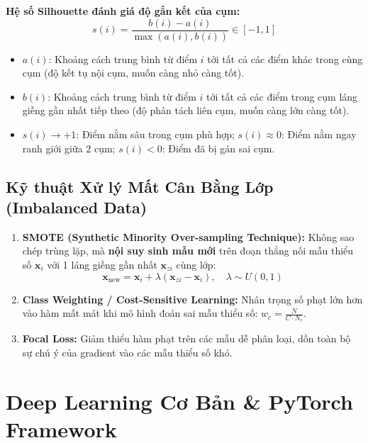 \documentclass[10pt,a4paper]{article}
\begin{document}
\textbf{Hệ số Silhouette đánh giá độ gắn kết của cụm:}
\begin{equation}
    s(i) = \frac{b(i) - a(i)}{\max(a(i), b(i))} \in [-1, 1]
\end{equation}
\begin{itemize}[leftmargin=*]
    \item $a(i)$: Khoảng cách trung bình từ điểm $i$ tới tất cả các điểm khác trong cùng cụm (độ kết tụ nội cụm, muốn càng nhỏ càng tốt).
    \item $b(i)$: Khoảng cách trung bình từ điểm $i$ tới tất cả các điểm trong cụm láng giềng gần nhất tiếp theo (độ phân tách liên cụm, muốn càng lớn càng tốt).
    \item $s(i) \to +1$: Điểm nằm sâu trong cụm phù hợp; $s(i) \approx 0$: Điểm nằm ngay ranh giới giữa 2 cụm; $s(i) < 0$: Điểm đã bị gán sai cụm.
\end{itemize}

\subsection{Kỹ thuật Xử lý Mất Cân Bằng Lớp (Imbalanced Data)}
\begin{enumerate}[leftmargin=*]
    \item \textbf{SMOTE (Synthetic Minority Over-sampling Technique):} Không sao chép trùng lặp, mà \textbf{nội suy sinh mẫu mới} trên đoạn thẳng nối mẫu thiểu số $\mathbf{x}_i$ với 1 láng giềng gần nhất $\mathbf{x}_{zi}$ cùng lớp:
    \begin{equation}
        \mathbf{x}_{\text{new}} = \mathbf{x}_i + \lambda (\mathbf{x}_{zi} - \mathbf{x}_i), \quad \lambda \sim U(0, 1)
    \end{equation}
    \item \textbf{Class Weighting / Cost-Sensitive Learning:} Nhân trọng số phạt lớn hơn vào hàm mất mát khi mô hình đoán sai mẫu thiểu số: $w_c = \frac{N}{C \cdot N_c}$.
    \item \textbf{Focal Loss:} Giảm thiểu hàm phạt trên các mẫu dễ phân loại, dồn toàn bộ sự chú ý của gradient vào các mẫu thiểu số khó.
\end{enumerate}

\section{Deep Learning Cơ Bản \& PyTorch Framework}
\end{document}
